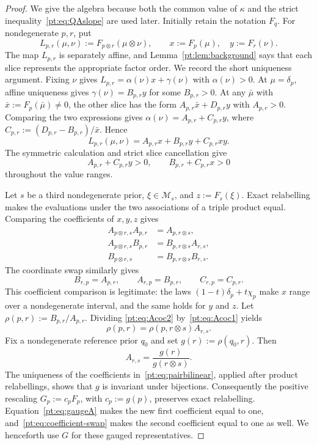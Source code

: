 \documentclass[11pt,a4paper]{article}
\theoremstyle{definition}
\newcommand{\1}{\mathbf 1}
\begin{document}
\begin{proof}
We give the algebra because both the common value of $\kappa$ and the strict
inequality~\eqref{pt:eq:QAslope} are used later.  Initially retain the notation
$F_q$.  For nondegenerate $p,r$, put
\[
 L_{p,r}(\mu,\nu):=F_{p\otimes r}(\mu\otimes\nu),
 \qquad x:=F_p(\mu),\quad y:=F_r(\nu).
\]
The map $L_{p,r}$ is separately affine, and
Lemma~\ref{pt:lem:background} says that each slice represents the appropriate
factor order.  We record the short uniqueness argument.  Fixing $\nu$ gives
$L_{p,r}=\alpha(\nu)x+\gamma(\nu)$ with $\alpha(\nu)>0$.  At
$\mu=\delta_p$, affine uniqueness gives
$\gamma(\nu)=B_{p,r}y$ for some $B_{p,r}>0$.  At any $\bar\mu$ with
$\bar x:=F_p(\bar\mu)\ne0$, the other slice has the form
$A_{p,r}\bar x+D_{p,r}y$ with $A_{p,r}>0$.  Comparing the two expressions
gives $\alpha(\nu)=A_{p,r}+C_{p,r}y$, where
$C_{p,r}:=(D_{p,r}-B_{p,r})/\bar x$.  Hence
\begin{equation}
 L_{p,r}(\mu,\nu)
 =A_{p,r}x+B_{p,r}y+C_{p,r}xy.
\label{pt:eq:pairbilinear}
\end{equation}
The symmetric calculation and strict slice cancellation give
\begin{equation}
 A_{p,r}+C_{p,r}y>0,
 \qquad B_{p,r}+C_{p,r}x>0
\label{pt:eq:pair-slopes}
\end{equation}
throughout the value ranges.

Let $s$ be a third nondegenerate prior, $\xi\in\mathcal M_s$, and
$z:=F_s(\xi)$.  Exact relabelling makes the evaluations under the two
associations of a triple product equal.  Comparing the coefficients of $x,y,z$ gives
\begin{align}
 A_{p\otimes r,s}A_{p,r}&=A_{p,r\otimes s},\label{pt:eq:Acoc1}\\
 A_{p\otimes r,s}B_{p,r}&=B_{p,r\otimes s}A_{r,s},\label{pt:eq:Acoc2}\\
 B_{p\otimes r,s}&=B_{p,r\otimes s}B_{r,s}.
\label{pt:eq:Acoc3}
\end{align}
The coordinate swap similarly gives
\[
 B_{r,p}=A_{p,r},\qquad A_{r,p}=B_{p,r},\qquad C_{r,p}=C_{p,r}.
\tag{SW}\label{pt:eq:coefficient-swap}
\]
This coefficient comparison is legitimate: the laws
$(1-t)\delta_p+t\chi_p$ make $x$ range over a nondegenerate interval, and
the same holds for $y$ and $z$.
Let $\rho(p,r):=B_{p,r}/A_{p,r}$.  Dividing
\eqref{pt:eq:Acoc2} by~\eqref{pt:eq:Acoc1} yields
\[
 \rho(p,r)=\rho(p,r\otimes s)A_{r,s}.
\]
Fix a nondegenerate reference prior $q_0$ and set
$g(r):=\rho(q_0,r)$.  Then
\begin{equation}
 A_{r,s}=\frac{g(r)}{g(r\otimes s)}.
\label{pt:eq:gaugeA}
\end{equation}
The uniqueness of the coefficients in~\eqref{pt:eq:pairbilinear}, applied
after product relabellings, shows that $g$ is invariant under bijections.
Consequently the positive rescaling $G_p:=c_pF_p$, with $c_p:=g(p)$,
preserves exact relabelling.  Equation~\eqref{pt:eq:gaugeA} makes the new first coefficient
equal to one, and~\eqref{pt:eq:coefficient-swap} makes the second coefficient
equal to one as well.  We henceforth use $G$ for these gauged representatives.


\end{proof}
\end{document}
